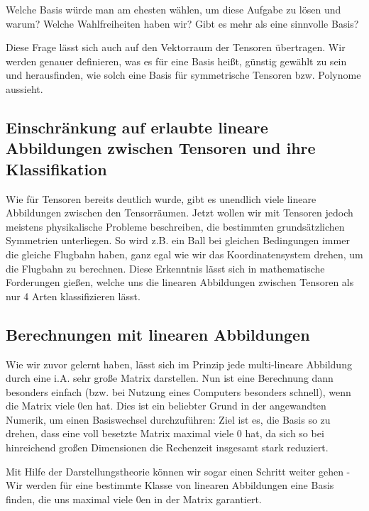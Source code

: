 Welche Basis würde man am ehesten wählen, um diese Aufgabe zu lösen und warum? Welche Wahlfreiheiten haben wir? Gibt es mehr als eine sinnvolle Basis?


Diese Frage lässt sich auch auf den Vektorraum der Tensoren übertragen. Wir werden genauer definieren, was es für eine Basis heißt, günstig gewählt zu sein und herausfinden, wie solch eine Basis für symmetrische Tensoren bzw. Polynome aussieht.

\subsection{Einschränkung auf erlaubte lineare Abbildungen zwischen Tensoren und ihre Klassifikation}
Wie für Tensoren bereits deutlich wurde, gibt es unendlich viele lineare Abbildungen zwischen den Tensorräumen. Jetzt wollen wir mit Tensoren jedoch meistens physikalische Probleme beschreiben, die bestimmten grundsätzlichen Symmetrien unterliegen. So wird z.B. ein Ball bei gleichen Bedingungen immer die gleiche Flugbahn haben, ganz egal wie wir das Koordinatensystem drehen, um die Flugbahn zu berechnen. Diese Erkenntnis lässt sich in mathematische Forderungen gießen, welche uns die linearen Abbildungen zwischen Tensoren als nur 4 Arten klassifizieren lässt.

\subsection{Berechnungen mit linearen Abbildungen}
Wie wir zuvor gelernt haben, lässt sich im Prinzip jede multi-lineare Abbildung durch eine i.A. sehr große Matrix darstellen. Nun ist eine Berechnung dann besonders einfach (bzw. bei Nutzung eines Computers besonders schnell), wenn die Matrix viele 0en hat. Dies ist ein beliebter Grund in der angewandten Numerik, um einen Basiswechsel durchzuführen: Ziel ist es, die Basis so zu drehen, dass eine voll besetzte Matrix maximal viele 0 hat, da sich so bei hinreichend großen Dimensionen die Rechenzeit insgesamt stark reduziert. 

Mit Hilfe der Darstellungstheorie können wir sogar einen Schritt weiter gehen - Wir werden für eine bestimmte Klasse von linearen Abbildungen eine Basis finden, die uns maximal viele 0en in der Matrix garantiert.

